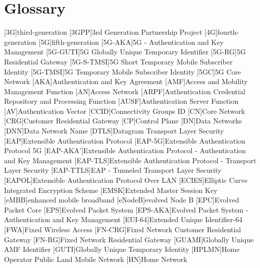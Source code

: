 \chapter{Glossary}

\footnotesize
\SingleSpacing

\begin{acronym}[AAAAAA]
[3G]{third-generation}
[3GPP]{3rd Generation Partnership Project}
[4G]{fourth-generation}
[5G]{fifth-generation}
[5G-AKA]{5G - Authentication and Key Management}
[5G-GUTI]{5G Globally Unique Temporary Identifier}
[5G-RG]{5G Residential Gateway}
[5G-S-TMSI]{5G Short Temporary Mobile Subscriber Identity}
[5G-TMSI]{5G Temporary Mobile Subscriber Identity}
[5GC]{5G Core Network}
[AKA]{Authentication and Key Agreement}
[AMF]{Access and Mobility Management Function}
[AN]{Access Network}
[ARPF]{Authentication Credential Repository and Processing Function}
[AUSF]{Authentication Server Function}
[AV]{Authentication Vector}
[CCID]{Connectivity Groups ID}
[CN]{Core Network}
[CRG]{Customer Residential Gateway}
[CP]{Control Plane}
[DN]{Data Networks}
[DNN]{Data Network Name}
[DTLS]{Datagram Transport Layer Security}
[EAP]{Extensible Authentication Protocol}
[EAP-5G]{Extensible Authentication Protocol 5G}
[EAP-AKA']{Extensible Authentication Protocol - Authentication and Key Management}
[EAP-TLS]{Extensible Authentication Protocol - Transport Layer Security}
[EAP-TTLS]{EAP - Tunneled Transport Layer Security}
[EAPOL]{Extensible Authentication Protocol Over LAN}
[ECIES]{Elliptic Curve Integrated Encryption Scheme}
[EMSK]{Extended Master Session Key}
[eMBB]{enhanced mobile broadband}
[eNodeB]{evolved Node B}
[EPC]{Evolved Packet Core}
[EPS]{Evolved Packet System}
[EPS-AKA]{Evolved Packet System - Authentication and Key Management}
[EUI-64]{Extended Unique Identifier-64}
[FWA]{Fixed Wireless Access}
[FN-CRG]{Fixed Network Customer Residential Gateway}
[FN-RG]{Fixed Network Residential Gateway}
[GUAMI]{Globally Unique AMF Identifier}
[GUTI]{Globally Unique Temporary Identity}
[HPLMN]{Home Operator Public Land Mobile Network}
[HN]{Home Network}

\end{acronym}

